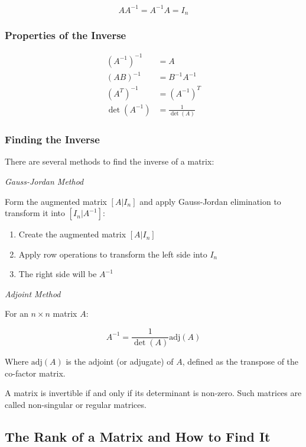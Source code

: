 \[
    A A^{-1} = A^{-1} A = I_n
\]

\subsubsection{Properties of the Inverse}

\begin{align*}
    {(A^{-1})}^{-1} &= A \\
    {(AB)}^{-1} &= B^{-1}A^{-1} \\
    {(A^T)}^{-1} &= {(A^{-1})}^T \\
    \det(A^{-1}) &= \frac{1}{\det(A)}
\end{align*}

\subsubsection{Finding the Inverse}
There are several methods to find the inverse of a matrix:

\emph{Gauss-Jordan Method} 

Form the augmented matrix \([A|I_n]\) and apply Gauss-Jordan elimination to transform it into \([I_n|A^{-1}]\):

\begin{enumerate}

    \item Create the augmented matrix \([A|I_n]\)

    \item Apply row operations to transform the left side into \(I_n\)

    \item The right side will be \(A^{-1}\)

\end{enumerate}

\emph{Adjoint Method}

For an \(n \times n\) matrix \(A\):

\[
    A^{-1} = \frac{1}{\det(A)} \text{adj}(A)
\]

Where \(\text{adj}(A)\) is the adjoint (or adjugate) of \(A\), defined as the transpose of the co-factor matrix.

A matrix is invertible if and only if its determinant is non-zero. Such matrices are called non-singular or regular matrices.

\subsection{The Rank of a Matrix and How to Find It}

